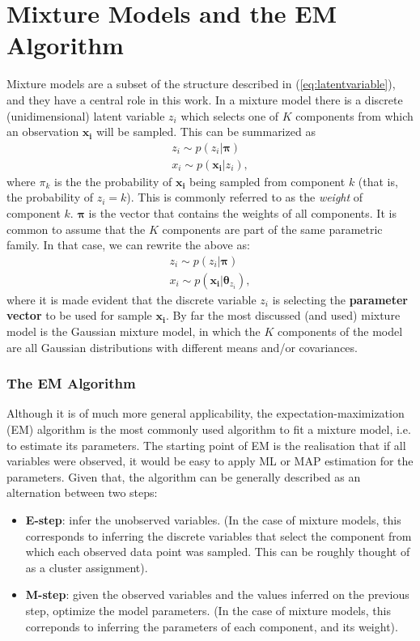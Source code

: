 \section{Mixture Models and the EM Algorithm}
\label{section:mmodels}
Mixture models are a subset of the structure  described in (\ref{eq:latentvariable}),
and they have a central role in this work. In a mixture model there is a discrete
(unidimensional) latent variable $z_i$ which selects one of $K$ components from which an observation
$\bm{x_i}$ will be sampled. This can be summarized as
\begin{align}
    z_i \sim p(z_i | \bm\pi) \\
    x_i \sim p(\bm{x_i} | z_i),
\end{align} where $\pi_k$ is the the probability of $\bm{x_i}$ being sampled
from component $k$ (that is, the probability of $z_i = k$). This is commonly referred
to as the \emph{weight} of component $k$. $\bm\pi$ is the vector that contains
the weights of all components.
It is common to assume that the $K$ components are part of the same
parametric family. In that case, we can rewrite the above as:
\begin{align}
    z_i \sim p(z_i | \bm\pi) \\
    x_i \sim p(\bm{x_i} | \bm{\theta}_{z_i}),
\end{align} where it is made evident that the discrete variable $z_i$ is selecting
the \textbf{parameter vector} to be used for sample $\bm{x_i}$. By far the most
discussed (and used) mixture model is the Gaussian mixture model, in which the
$K$ components of the model are all Gaussian distributions with different means
and/or covariances.

\subsubsection{The EM Algorithm}
Although it is of much more general applicability, the expectation-maximization
(EM) algorithm is the most commonly used algorithm to fit a mixture model, i.e.
to estimate its parameters. The starting point of EM is the realisation that if
all variables were observed, it would be easy to apply ML or MAP estimation for
the parameters. Given that, the algorithm can be generally described as an alternation
between two steps:
\begin{itemize}
    \item \textbf{E-step}: infer the unobserved variables.
        (In the case of mixture models, this corresponds to inferring the discrete
        variables that select the component from which each observed data point
        was sampled. This can be roughly thought of as a cluster assignment).
    \item \textbf{M-step}: given the observed variables and the values inferred
        on the previous step, optimize the model parameters. (In the case of 
        mixture models, this correponds to inferring the parameters of each
        component, and its weight).
\end{itemize}

